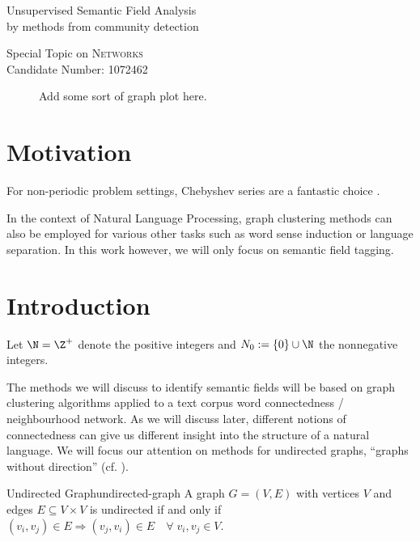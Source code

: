 \documentclass[12pt, a4paper]{article}
\title{\topictitle}
\author{Candidate \candidatenumber}
\date{\today}
\newcommand{\chebyshev}{Chebyshev\xspace}
\newcommand{\topictitle}{Unsupervised Semantic Field Analysis \\ \large by methods from community detection}
\newcommand{\candidatenumber}{1072462}
\newcommand{\course}{Networks}
\begin{document}
  \pagestyle{plain}
  \begin{center}
    \vspace*{-2.5cm}
    \Large \topictitle \\
    \vspace{.3cm}

    \normalsize Special Topic on \textcolor{themecolor3}{\textsc{\course}}\\
    \normalsize Candidate Number: \textcolor{themecolor3}{\candidatenumber}
    \vspace{.3cm}
  \end{center}

  \begin{abstract}
    \label{abstract}
    This work will attempt to
  \end{abstract}

  \begin{figure}[H]
    \centering
    \caption{Add some sort of graph plot here.}
  \end{figure}

  \pagebreak
  \pagestyle{normal}


  \section{Motivation}
  For non-periodic problem settings, \chebyshev series are a fantastic choice \parencite{cw-biemann}.

  In the context of Natural Language Processing, graph clustering methods can also be employed for various other tasks such as word sense induction or language separation.
  In this work however, we will only focus on semantic field tagging.

  \pagebreak
  \section{Introduction}
  Let $\N = \Z^+$ denote the positive integers and $N_0 := \{0\} \cup \N$ the nonnegative integers.

  The methods we will discuss to identify semantic fields will be based on graph clustering algorithms applied to a text corpus word connectedness / neighbourhood network.
  As we will discuss later, different notions of connectedness can give us different insight into the structure of a natural language.
  We will focus our attention on methods for undirected graphs, ``graphs without direction'' (cf. ).
  \begin{definition}{Undirected Graph}{undirected-graph}
    A graph $G = (V, E)$ with vertices $V$ and edges $E \subseteq V \times V$ is undirected if and only if $(v_i, v_j) \in E \Rightarrow (v_j, v_i) \in E \quad \forall\; v_i, v_j \in V$.
  \end{definition}
\end{document}
